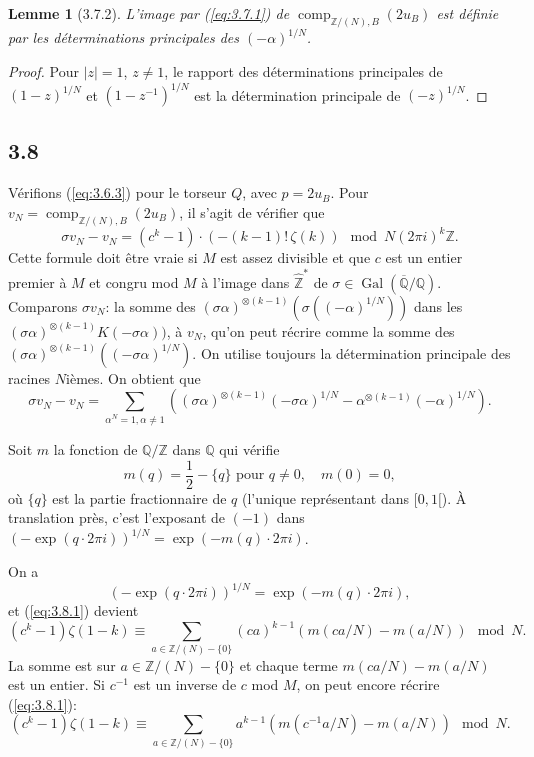 \documentclass[12pt,a4paper]{article}
\theoremstyle{plain}
\newtheorem{lemma}[theorem]{Lemme}
\theoremstyle{definition}
\theoremstyle{remark}
\DeclareMathOperator{\Gal}{Gal}
\providecommand{\Gal}{\operatorname{Gal}}
\providecommand{\comp}{\operatorname{comp}}
\begin{document}
\begin{lemma}[3.7.2]\label{lem:3.7.2}
L'image par (\ref{eq:3.7.1}) de $\comp_{\mathbb{Z}/(N),B}(2u_B)$ est d\'efinie par les
d\'eterminations principales des $(-\alpha)^{1/N}$.
\end{lemma}
\begin{proof}
Pour $|z| = 1$, $z \neq 1$, le rapport des d\'eterminations principales de
$(1-z)^{1/N}$ et $(1-z^{-1})^{1/N}$ est la d\'etermination principale de $(-z)^{1/N}$.
\end{proof}

\subsection*{3.8}

V\'erifions (\ref{eq:3.6.3}) pour le torseur $Q$, avec $p = 2u_B$. Pour $v_N =
\comp_{\mathbb{Z}/(N),B}(2u_B)$, il s'agit de v\'erifier que
\begin{equation}\label{eq:3.8.1}
\sigma v_N - v_N = (c^k-1) \cdot (-(k-1)!\,\zeta(k)) \mod N(2\pi i)^k \mathbb{Z}.
\end{equation}
Cette formule doit \^etre vraie si $M$ est assez divisible et que $c$ est un entier
premier \`a $M$ et congru mod $M$ \`a l'image dans $\hat{\mathbb{Z}}^*$ de $\sigma \in
\Gal(\overline{\mathbb{Q}}/\mathbb{Q})$. Comparons $\sigma v_N$: la somme des
$(\sigma\alpha)^{\otimes(k-1)}(\sigma((-\alpha)^{1/N}))$ dans les
$(\sigma\alpha)^{\otimes(k-1)} K(-\sigma\alpha))$, \`a $v_N$, qu'on peut r\'ecrire comme
la somme des $(\sigma\alpha)^{\otimes(k-1)}((-\sigma\alpha)^{1/N})$. On utilise toujours la
d\'etermination principale des racines $N$i\`emes. On obtient que
\[
\sigma v_N - v_N = \sum_{\alpha^N=1, \alpha \neq 1} ((\sigma\alpha)^{\otimes(k-1)}
(-\sigma\alpha)^{1/N} - \alpha^{\otimes(k-1)}(-\alpha)^{1/N}).
\]

Soit $m$ la fonction de $\mathbb{Q}/\mathbb{Z}$ dans $\mathbb{Q}$ qui v\'erifie
\begin{equation}\label{eq:3.8.2}
m(q) = \frac{1}{2} - \{q\} \text{ pour } q \neq 0, \quad m(0) = 0,
\end{equation}
o\`u $\{q\}$ est la partie fractionnaire de $q$ (l'unique repr\'esentant dans $[0,1[$).
\`A translation pr\`es, c'est l'exposant de $(-1)$ dans
$(-\exp(q \cdot 2\pi i))^{1/N} = \exp(-m(q) \cdot 2\pi i)$.

On a
\[
(-\exp(q \cdot 2\pi i))^{1/N} = \exp(-m(q) \cdot 2\pi i),
\]
et (\ref{eq:3.8.1}) devient
\[
(c^k-1) \zeta(1-k) \equiv \sum_{a \in \mathbb{Z}/(N)-\{0\}} (ca)^{k-1}
(m(ca/N) - m(a/N)) \mod N.
\]
La somme est sur $a \in \mathbb{Z}/(N) - \{0\}$ et chaque terme $m(ca/N) - m(a/N)$ est
un entier. Si $c^{-1}$ est un inverse de $c$ mod $M$, on peut encore r\'ecrire
(\ref{eq:3.8.1}):
\begin{equation}\label{eq:3.8.3}
(c^k-1)\zeta(1-k) \equiv \sum_{a \in \mathbb{Z}/(N)-\{0\}} a^{k-1}
(m(c^{-1}a/N) - m(a/N)) \mod N.
\end{equation}
\end{document}
